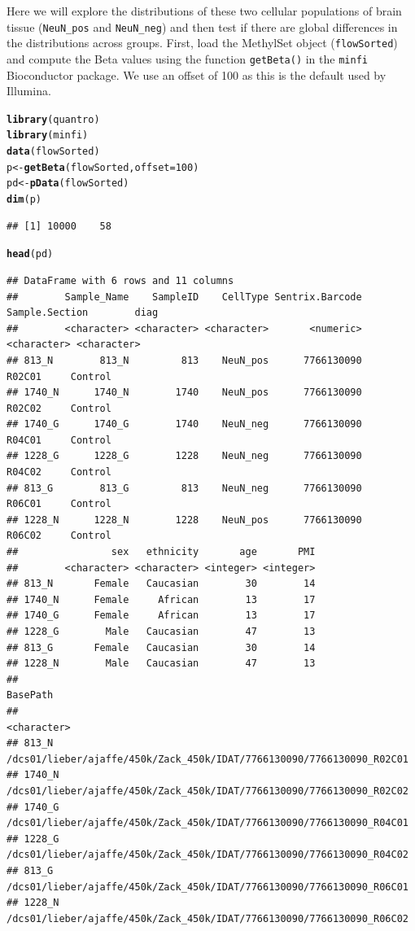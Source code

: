 \documentclass{article}\usepackage[]{graphicx}\usepackage[usenames,dvipsnames]{color}
\makeatletter
\newcommand{\hlnum}[1]{\textcolor[rgb]{0.686,0.059,0.569}{#1}}%
\newcommand{\hlstd}[1]{\textcolor[rgb]{0.345,0.345,0.345}{#1}}%
\newcommand{\hlkwb}[1]{\textcolor[rgb]{0.69,0.353,0.396}{#1}}%
\newcommand{\hlkwc}[1]{\textcolor[rgb]{0.333,0.667,0.333}{#1}}%
\newcommand{\hlkwd}[1]{\textcolor[rgb]{0.737,0.353,0.396}{\textbf{#1}}}%
\newenvironment{kframe}{%
 \def\at@end@of@kframe{}%
 \ifinner\ifhmode%
  \def\at@end@of@kframe{\end{minipage}}%
  \begin{minipage}{\columnwidth}%
 \fi\fi%
 \def\FrameCommand##1{\hskip\@totalleftmargin \hskip-\fboxsep
 \colorbox{shadecolor}{##1}\hskip-\fboxsep
     \hskip-\linewidth \hskip-\@totalleftmargin \hskip\columnwidth}%
 \MakeFramed {\advance\hsize-\width
   \@totalleftmargin\z@ \linewidth\hsize
   \@setminipage}}%
 {\par\unskip\endMakeFramed%
 \at@end@of@kframe}
\newenvironment{knitrout}{}{} %
\makeatother
\begin{document}
Here we will explore the distributions of these two cellular populations of 
brain tissue (\verb+NeuN_pos+ and \verb+NeuN_neg+) and then test if there 
are global differences in the distributions across groups. First, load the 
MethylSet object (\texttt{flowSorted}) and compute the Beta values using 
the function \texttt{getBeta()} in the \texttt{minfi} Bioconductor package. 
We use an offset of 100 as this is the default used by Illumina. 

\begin{knitrout}
\color{fgcolor}\begin{kframe}
\begin{alltt}
\hlkwd{library}\hlstd{(quantro)}
\hlkwd{library}\hlstd{(minfi)}
\hlkwd{data}\hlstd{(flowSorted)}
\hlstd{p} \hlkwb{<-} \hlkwd{getBeta}\hlstd{(flowSorted,} \hlkwc{offset} \hlstd{=} \hlnum{100}\hlstd{)}
\hlstd{pd} \hlkwb{<-} \hlkwd{pData}\hlstd{(flowSorted)}
\hlkwd{dim}\hlstd{(p)}
\end{alltt}
\begin{verbatim}
## [1] 10000    58
\end{verbatim}
\begin{alltt}
\hlkwd{head}\hlstd{(pd)}
\end{alltt}
\begin{verbatim}
## DataFrame with 6 rows and 11 columns
##        Sample_Name    SampleID    CellType Sentrix.Barcode Sample.Section        diag
##        <character> <character> <character>       <numeric>    <character> <character>
## 813_N        813_N         813    NeuN_pos      7766130090         R02C01     Control
## 1740_N      1740_N        1740    NeuN_pos      7766130090         R02C02     Control
## 1740_G      1740_G        1740    NeuN_neg      7766130090         R04C01     Control
## 1228_G      1228_G        1228    NeuN_neg      7766130090         R04C02     Control
## 813_G        813_G         813    NeuN_neg      7766130090         R06C01     Control
## 1228_N      1228_N        1228    NeuN_pos      7766130090         R06C02     Control
##                sex   ethnicity       age       PMI
##        <character> <character> <integer> <integer>
## 813_N       Female   Caucasian        30        14
## 1740_N      Female     African        13        17
## 1740_G      Female     African        13        17
## 1228_G        Male   Caucasian        47        13
## 813_G       Female   Caucasian        30        14
## 1228_N        Male   Caucasian        47        13
##                                                                     BasePath
##                                                                  <character>
## 813_N  /dcs01/lieber/ajaffe/450k/Zack_450k/IDAT/7766130090/7766130090_R02C01
## 1740_N /dcs01/lieber/ajaffe/450k/Zack_450k/IDAT/7766130090/7766130090_R02C02
## 1740_G /dcs01/lieber/ajaffe/450k/Zack_450k/IDAT/7766130090/7766130090_R04C01
## 1228_G /dcs01/lieber/ajaffe/450k/Zack_450k/IDAT/7766130090/7766130090_R04C02
## 813_G  /dcs01/lieber/ajaffe/450k/Zack_450k/IDAT/7766130090/7766130090_R06C01
## 1228_N /dcs01/lieber/ajaffe/450k/Zack_450k/IDAT/7766130090/7766130090_R06C02
\end{verbatim}
\end{kframe}
\end{knitrout}
\end{document}
